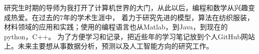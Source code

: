 \cvsection{}


\begin{cvparagraph}

研究生时期的导师为我打开了计算机世界的大门，从此以后，编程和数学从兴趣变成热爱。在过去的7年的学术生涯中，
着力于研究先进的模型，算法在纺织服装，材料领域的应用和实践；使用的编程语言也从Matlab，到Java，到现在的python，C++。
为了方便学习和记录，把近些年的学习笔记放到个人GitHub网站上。未来主要想从事数据分析，预测以及人工智能方向的研究工作。
\end{cvparagraph}
